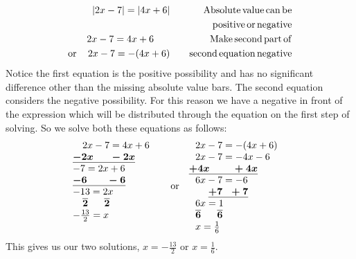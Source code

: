 \begin{example}\label{Lin41}
  \begin{eqnarray*}
    |2x - 7| = |4x + 6|  &  & \operatorname{Absolute} \operatorname{value} \operatorname{can}
    \operatorname{be}\\
		& & \operatorname{~~~positive} \operatorname{or} \operatorname{negative}\\
    2 x - 7 = 4 x + 6~~~~~&  & \operatorname{Make}
    \operatorname{second} \operatorname{part} \operatorname{of}\\
		  \operatorname{or~~~} 2 x - 7 = - (4 x + 6) & &\operatorname{~~~second} \operatorname{equation} \operatorname{negative}
  \end{eqnarray*}
  Notice the first equation is the positive possibility and has no significant
  difference other than the missing absolute value bars. The second equation
  considers the negative possibility. For this reason we have a negative in
  front of the expression which will be distributed through the equation on
  the first step of solving. So we solve both these equations as follows:
  \begin{eqnarray*}
    \begin{array}{l}
      ~~~2 x - 7 = 4 x + 6\\
      \boldsymbol{\underline{- 2 x ~~~~~- 2 x}~~~}~~~~~\\
      - 7 = 2 x + 6\\
      \boldsymbol{\underline{- 6 ~~~~~~- 6}}\\
      - 13 = 2 x\\
      ~~~\boldsymbol{\overline{2} ~~~~~ \overline{2}}\\
      -\frac{13}{2} = x\\
    			~

		\end{array} \operatorname{~or~} \begin{array}{l}
      ~~2 x - 7 = - (4 x + 6)\\
      ~~2 x - 7 = - 4 x - 6\\
      \boldsymbol{\underline{+ 4 x ~~~~~~~+ 4 x}}\\
      ~~6 x - 7 = - 6\\
      ~~~~~~\boldsymbol{ \underline{+ 7 ~~+ 7}}\\
      ~~6 x = 1\\
      ~~\boldsymbol{\overline{6} ~~~~~ \overline{6}}\\
      ~~x = \frac{1}{6}
    \end{array} &  & 
  \end{eqnarray*}
   This gives us our two solutions, $x = -\frac{13}{2}$ or $x = \frac{1}{6}$.
\end{example}